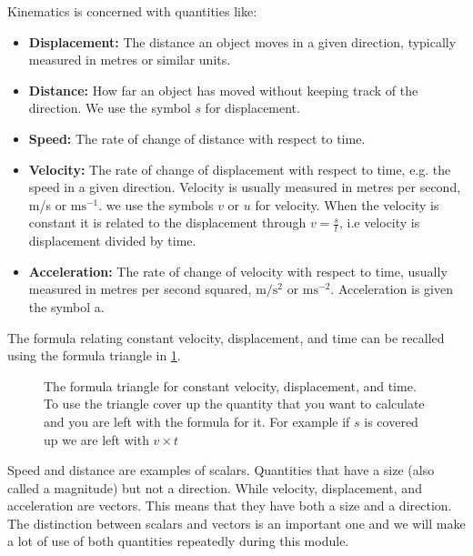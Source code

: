 \documentclass[a4paper,12pt]{book}
\begin{document}
Kinematics is concerned with quantities like:
\begin{itemize}
\setlength{\itemsep}{-5pt}
    \item \textbf{Displacement:} The distance an object moves in a given direction, typically measured in metres or similar units.
    \item \textbf{Distance:} How far an object has moved without keeping track of the direction. We use the symbol $s$ for displacement.
    \item \textbf{Speed:} The rate of change of distance with respect to time.
    \item \textbf{Velocity:} The rate of change of displacement with respect to time, e.g. the speed in a given direction. Velocity is usually measured in metres per second, m/s or $\text{ms}^{-1}$. we use the symbols $v$ or $u$ for velocity. When the velocity is constant it is related to the displacement through $v=\frac{s}{t}$, i.e velocity is displacement divided by time.
    \item \textbf{Acceleration:} The rate of change of velocity with respect to time, usually measured in metres per second squared, $\text{m/}\text{s}^{2}$ or $\text{ms}^{-2}$. Acceleration is given the symbol a.
\end{itemize}

The formula relating constant velocity, displacement, and time can be recalled using the formula triangle in \cref{fig: vst triangle}.\\

\begin{figure}[ht]
    \centering
  {\displaymathother
   \Huge {}
   }
    \caption{The formula triangle for constant velocity, displacement, and time. To use the triangle cover up the quantity that you want to calculate and you are left with the formula for it. For example if $s$ is covered up we are left with $v\times t$}
    \label{fig: vst triangle}
\end{figure}


Speed and distance are examples of scalars. Quantities that have a size (also called a magnitude) but not a direction. While velocity, displacement, and acceleration are vectors. This means that they have both a size and a direction.\\

The distinction between scalars and vectors is an important one and we will make a lot of use of both quantities repeatedly during this module.
\end{document}
